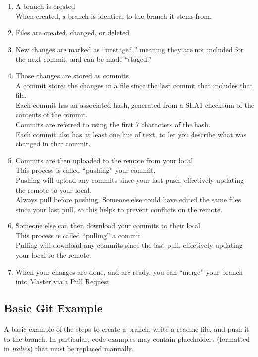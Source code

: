 \documentclass{article}
\begin{document}
\begin{enumerate}
	\item A branch is created
		\\When created, a branch is identical to the branch it stems from.
	\item Files are created, changed, or deleted
	\item New changes are marked as ``unstaged,'' meaning they are not included for the next commit, and can be made ``staged.''
	\item Those changes are stored as commits
		\\A commit stores the changes in a file since the last commit that includes that file.
		\\Each commit has an associated hash, generated from a SHA1 checksum of the contents of the commit.
		\\Commits are referred to using the first 7 characters of the hash.
		\\Each commit also has at least one line of text, to let you describe what was changed in that commit.
	\item Commits are then uploaded to the remote from your local
		\\This process is called ``pushing'' your commit.
		\\Pushing will upload any commits since your last push, effectively updating the remote to your local.
		\\Always pull before pushing. Someone else could have edited the same files since your last pull, so this helps to prevent conflicts on the remote.
	\item Someone else can then download your commits to their local
		\\This process is called ``pulling'' a commit
		\\Pulling will download any commits since the last pull, effectively updating your local to the remote.
	\item When your changes are done, and are ready, you can ``merge'' your branch into Master via a Pull Request
\end{enumerate}

\subsection{Basic Git Example}

A basic example of the steps to create a branch, write a readme file, and push it to the branch.
In particular, code examples may contain placeholders (formatted in \textit{italics}) that must be replaced manually.\\
\end{document}
